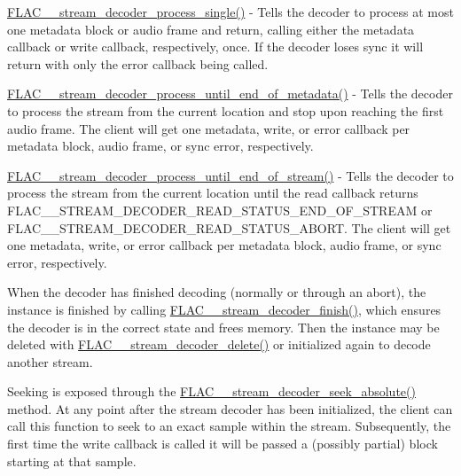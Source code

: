 \begin{DoxyItemize}
\item \mbox{\hyperlink{group__flac__stream__decoder_ga8c4708eb2c5d99595f64dc2473aa2f42}{F\+L\+A\+C\+\_\+\+\_\+stream\+\_\+decoder\+\_\+process\+\_\+single()}} -\/ Tells the decoder to process at most one metadata block or audio frame and return, calling either the metadata callback or write callback, respectively, once. If the decoder loses sync it will return with only the error callback being called.
\item \mbox{\hyperlink{group__flac__stream__decoder_ga5e07ca9bf67dabf2521737f63b2156e2}{F\+L\+A\+C\+\_\+\+\_\+stream\+\_\+decoder\+\_\+process\+\_\+until\+\_\+end\+\_\+of\+\_\+metadata()}} -\/ Tells the decoder to process the stream from the current location and stop upon reaching the first audio frame. The client will get one metadata, write, or error callback per metadata block, audio frame, or sync error, respectively.
\item \mbox{\hyperlink{group__flac__stream__decoder_ga4544352442870ea9f16f388a97d81dff}{F\+L\+A\+C\+\_\+\+\_\+stream\+\_\+decoder\+\_\+process\+\_\+until\+\_\+end\+\_\+of\+\_\+stream()}} -\/ Tells the decoder to process the stream from the current location until the read callback returns F\+L\+A\+C\+\_\+\+\_\+\+S\+T\+R\+E\+A\+M\+\_\+\+D\+E\+C\+O\+D\+E\+R\+\_\+\+R\+E\+A\+D\+\_\+\+S\+T\+A\+T\+U\+S\+\_\+\+E\+N\+D\+\_\+\+O\+F\+\_\+\+S\+T\+R\+E\+AM or F\+L\+A\+C\+\_\+\+\_\+\+S\+T\+R\+E\+A\+M\+\_\+\+D\+E\+C\+O\+D\+E\+R\+\_\+\+R\+E\+A\+D\+\_\+\+S\+T\+A\+T\+U\+S\+\_\+\+A\+B\+O\+RT. The client will get one metadata, write, or error callback per metadata block, audio frame, or sync error, respectively.
\end{DoxyItemize}

When the decoder has finished decoding (normally or through an abort), the instance is finished by calling \mbox{\hyperlink{group__flac__stream__decoder_gaa51bb38f762ee11b320a0839f165c5ce}{F\+L\+A\+C\+\_\+\+\_\+stream\+\_\+decoder\+\_\+finish()}}, which ensures the decoder is in the correct state and frees memory. Then the instance may be deleted with \mbox{\hyperlink{group__flac__stream__decoder_gab958ee28b829be37e541946676ad9677}{F\+L\+A\+C\+\_\+\+\_\+stream\+\_\+decoder\+\_\+delete()}} or initialized again to decode another stream.

Seeking is exposed through the \mbox{\hyperlink{group__flac__stream__decoder_ga5c1c70de72e6ed49db6d61a9131d9117}{F\+L\+A\+C\+\_\+\+\_\+stream\+\_\+decoder\+\_\+seek\+\_\+absolute()}} method. At any point after the stream decoder has been initialized, the client can call this function to seek to an exact sample within the stream. Subsequently, the first time the write callback is called it will be passed a (possibly partial) block starting at that sample.

